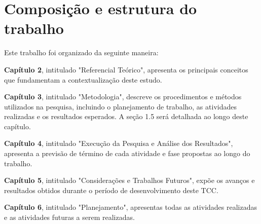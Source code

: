 \section{Composição e estrutura do trabalho}
Este trabalho foi organizado da seguinte maneira:

\textbf{Capítulo 2}, intitulado "Referencial Teórico", apresenta os principais conceitos que fundamentam a contextualização deste estudo.

\textbf{Capítulo 3}, intitulado "Metodologia", descreve os procedimentos e métodos utilizados na pesquisa, incluindo o planejamento de trabalho, as atividades realizadas e os resultados esperados. A seção 1.5 será detalhada ao longo deste capítulo.

\textbf{Capítulo 4}, intitulado "Execução da Pesquisa e Análise dos Resultados", apresenta a previsão de término de cada atividade e fase propostas ao longo do trabalho.

\textbf{Capítulo 5}, intitulado "Considerações e Trabalhos Futuros", expõe os avanços e resultados obtidos durante o período de desenvolvimento deste TCC.

\textbf{Capítulo 6}, intitulado "Planejamento", apresentas todas as atividades realizadas e as atividades futuras a serem realizadas.